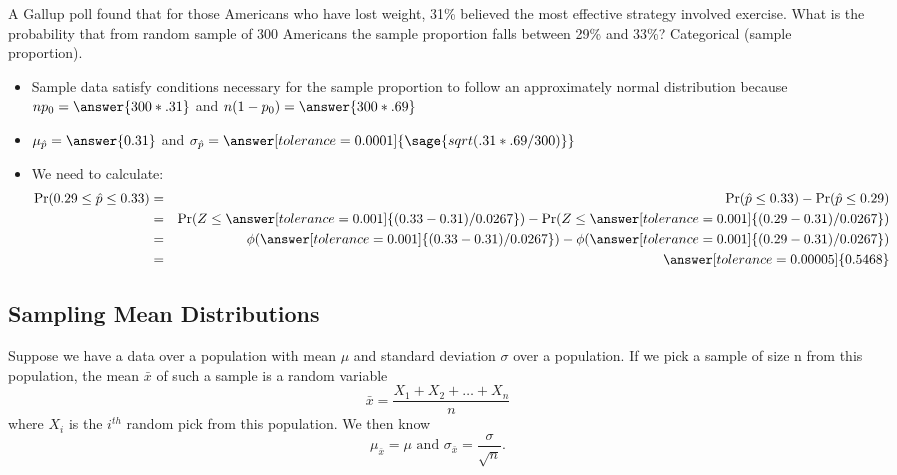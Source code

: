 \documentclass{ximera}
\begin{document}
\begin{problem}
A Gallup poll found that for those Americans who have lost weight, 31\% believed the most
effective strategy involved exercise. What is the probability that from random sample of 300
Americans the sample proportion falls between 29\% and 33\%? Categorical (sample proportion).  

\begin{explanation}
\begin{itemize} 
    \item Sample data  satisfy conditions necessary for the sample proportion to follow an
approximately normal distribution because $np_0=\answer{300*.31}$
and $n(1-p_0)=\answer{300*.69}$
    
    \item $\mu_{\hat p}=\answer{0.31}$ and $\sigma_{\hat p}=\answer[tolerance=0.0001]{\sage{sqrt(.31*.69/300)}}$

    \item We need to calculate:    
\begin{eqnarray*}
\Pr(0.29\leq \hat p \leq 0.33)
&=&
\Pr(\hat p \leq 0.33) -\Pr(\hat p \leq 0.29)
\\
&=&
\Pr(Z \leq \answer[tolerance=0.001]{(0.33 - 0.31)/0.0267 }) -\Pr(Z \leq \answer[tolerance=0.001]{(0.29 - 0.31)/0.0267 })
\\
&=& 
\phi(\answer[tolerance=0.001]{(0.33 - 0.31)/0.0267 })-\phi(\answer[tolerance=0.001]{(0.29 - 0.31)/0.0267 })
\\
&=&
\answer[tolerance=0.00005]{0.5468}
\end{eqnarray*}
\end{itemize}
\end{explanation}
\end{problem}

\subsection*{Sampling Mean Distributions}
Suppose we have a data over a population with mean $\mu$ and standard deviation $\sigma$ over a population. If we pick a sample of size n from this population, the mean $\bar x$ of such a sample is a random variable 
$$\bar{x}=\frac{X_1+X_2+\ldots+X_n}{n}$$
where $X_i$ is the $i^{th}$ random pick from this population. We then know
$$\mu_{\bar x}=\mu \mbox{ and } \sigma_{\bar x}=\frac{\sigma}{\sqrt{n}}.$$
\end{document}
